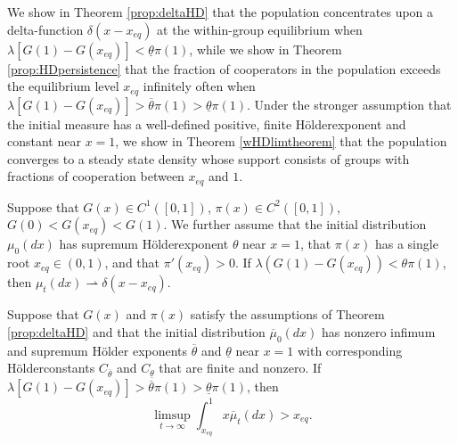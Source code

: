 \documentclass[11pt]{article}
\numberwithin{equation}{section}
\newcommand{\ds}{\displaystyle}
\newcommand{\ol}{\overline}
\newcommand{\holder}{H{\"o}lder\:}
\begin{document}
{We show in Theorem \ref{prop:deltaHD} that the population concentrates upon a delta-function $\delta(x - x_{eq})$  at the within-group equilibrium when $\lambda \left[G(1) - G(x_{eq})\right] < \underline{\theta} \pi(1)$, while we show in Theorem \ref{prop:HDpersistence} that the fraction of cooperators in the population exceeds the equilibrium level $x_{eq}$ infinitely often when $\lambda \left[G(1) - G(x_{eq})\right] > \overline{\theta} \pi(1) > \underline{\theta} \pi(1)$. Under the stronger assumption that the initial measure has a well-defined positive, finite \holder exponent and constant near $x=1$, we show in Theorem \ref{wHDlimtheorem} that the population converges to a steady state density whose support consists of groups with fractions of cooperation between $x_{eq}$ and $1$.



 \begin{theorem} \label{prop:deltaHD}
Suppose that $G(x) \in C^1([0,1])$, $\pi(x) \in C^2([0,1])$, $G(0) < G(x_{eq}) < G(1)$. We further assume that the initial distribution $\mu_0(dx)$ has supremum \holder exponent $\theta$ near $x = 1$, that $\pi(x)$ has a single root $x_{eq} \in (0,1)$, and 
that $\pi'(x_{eq}) > 0$. If $\lambda \left( G(1) - G(x_{eq})\right) < \theta \pi(1)$, then $\mu_t(dx) \rightharpoonup \delta(x - x_{eq})$.
 \end{theorem}
 
 
 
\begin{theorem} \label{prop:HDpersistence}
Suppose that $G(x)$ and $\pi(x)$ satisfy the assumptions of Theorem \ref{prop:deltaHD} and that the initial distribution $\overline{\mu}_0(dx)$ has nonzero infimum and supremum H{\"o}lder exponents $\overline{\theta}$ and $\underline{\theta}$ near $x=1$ with corresponding \holder constants $C_{\overline{\theta}}$ and $C_{\underline{\theta}}$ that are finite and nonzero. If $\lambda \left[G(1) - G(x_{eq}) \right] > \overline{\theta} \pi(1) > \underline{\theta} \pi(1)$, then
\begin{equation}
    \ds\limsup_{t \to \infty} \ds \int_{x_{eq}}^1 x \ol{\mu}_t(dx) > x_{eq}.
\end{equation}
\end{theorem}  
  
}
\end{document}
